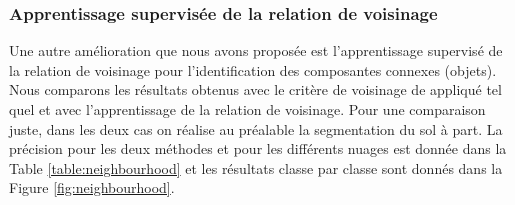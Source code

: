 \documentclass[a4paper, onecolumn, 11pt]{article}
\begin{document}
\raggedbottom

\subsubsection{Apprentissage supervisée de la relation de voisinage}

Une autre amélioration que nous avons proposée est l'apprentissage supervisé de la relation de voisinage pour l'identification des composantes connexes (objets). Nous comparons les résultats obtenus avec le critère de voisinage de \cite{aka_article} appliqué tel quel et avec l'apprentissage de la relation de voisinage. Pour une comparaison juste, dans les deux cas on réalise au préalable la segmentation du sol à part. La précision pour les deux méthodes et pour les différents nuages est donnée dans la Table \ref{table:neighbourhood} et les résultats classe par classe sont donnés dans la Figure \ref{fig:neighbourhood}.
\end{document}
